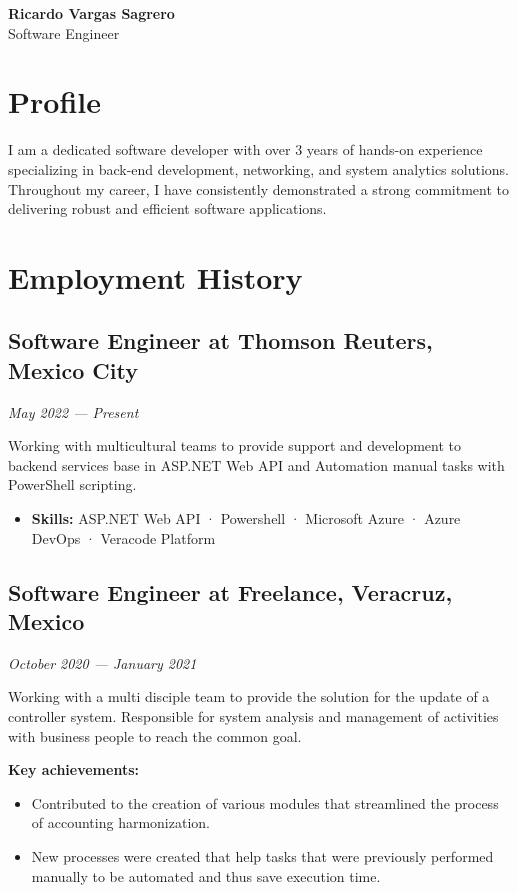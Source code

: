 \documentclass[11pt,a4paper]{article}
\begin{document}
{\Huge\color{orange}\textbf{Ricardo Vargas Sagrero}}\\[0.2cm]
{\Large Software Engineer}

\vspace{0.3cm}

\begin{minipage}[t]{0.65\textwidth}

\section*{\color{orange}Profile}
I am a dedicated software developer with over 3 years of hands-on experience specializing in back-end development, networking, and system analytics solutions. Throughout my career, I have consistently demonstrated a strong commitment to delivering robust and efficient software applications.

\section*{\color{orange}Employment History}

\subsection*{Software Engineer at Thomson Reuters, Mexico City}
\textit{May 2022 --- Present}

Working with multicultural teams to provide support and development to backend services base in ASP.NET Web API and Automation manual tasks with PowerShell scripting.

\begin{itemize}[leftmargin=*]
    \item \textbf{Skills:} ASP.NET Web API · Powershell · Microsoft Azure · Azure DevOps · Veracode Platform
\end{itemize}

\subsection*{Software Engineer at Freelance, Veracruz, Mexico}
\textit{October 2020 --- January 2021}

Working with a multi disciple team to provide the solution for the update of a controller system. Responsible for system analysis and management of activities with business people to reach the common goal.

\textbf{Key achievements:}
\begin{itemize}[leftmargin=*]
    \item Contributed to the creation of various modules that streamlined the process of accounting harmonization.
    \item New processes were created that help tasks that were previously performed manually to be automated and thus save execution time.
\end{itemize}



\end{minipage}
\end{document}
